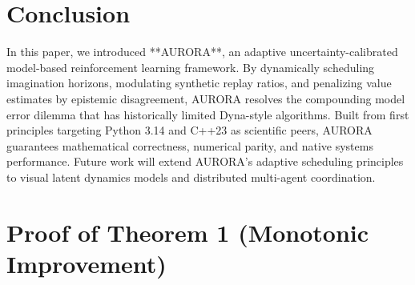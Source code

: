 \documentclass[11pt,a4paper]{article}
\theoremstyle{definition}
\theoremstyle{remark}
\begin{document}
\section{Conclusion}
\label{sec:conclusion}

In this paper, we introduced **AURORA**, an adaptive uncertainty-calibrated model-based reinforcement learning framework. By dynamically scheduling imagination horizons, modulating synthetic replay ratios, and penalizing value estimates by epistemic disagreement, AURORA resolves the compounding model error dilemma that has historically limited Dyna-style algorithms. Built from first principles targeting Python 3.14 and C++23 as scientific peers, AURORA guarantees mathematical correctness, numerical parity, and native systems performance. Future work will extend AURORA's adaptive scheduling principles to visual latent dynamics models and distributed multi-agent coordination.

\newpage



\newpage
\appendix

\section{Proof of Theorem 1 (Monotonic Improvement)}
\label{app:proof}
\end{document}

